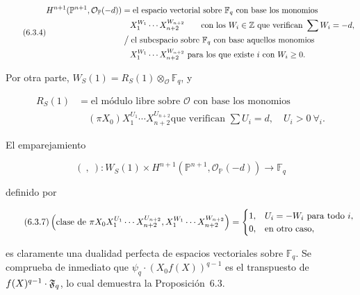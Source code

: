 {\footnotesize\begin{equation}\tag{6.3.4}
\begin{aligned}
H^{\sisi{i+1}{n+1}}(\mathbb P^{n+1},\mathcal O_{\mathbb P}(-d))
&=\text{el espacio vectorial sobre $\mathbb F_q$ con base los monomios}\\
&\quad X_1^{W_1}\cdots X_{n+2}^{W_{n+2}}
\qquad\text{con los }W_i\in\mathbb Z\text{ que verifican }\sum W_i=-d,\\
&\sisi{=}{\mathrel{\big/}}\text{el subespacio sobre $\mathbb F_q$ con base aquellos monomios}\\
&\quad X_1^{W_1}\cdots X_{n+2}^{W_{n+2}}
\text{ para los que existe }i\text{ con }W_i\geq0.
\end{aligned}
\end{equation}}

Por otra parte, $W_S(1)=R_S(1)\otimes_{\mathcal O}\mathbb F_q$, y

\begin{equation}\tag{6.3.5}
\begin{aligned}
R_S(1)
&=\text{el módulo libre sobre $\mathcal O$ con base los monomios}\\
&\quad
(\pi X_0)X_1^{U_1}\cdots X_{n+2}^{U_{n+2}}
\text{que verifican }
\sum U_i=d,\quad U_i>0\ \forall_i.
\end{aligned}
\end{equation}

El emparejamiento

\begin{equation}\tag{6.3.6}
(\ ,\ ):
W_S(1)\times
H^{n+1}(\mathbb P^{n+1},\mathcal O_{\mathbb P}(-d))
\longrightarrow\mathbb F_q
\end{equation}

definido por

{\small\begin{equation}\tag{6.3.7}
\left(
\text{clase de }\pi X_0X_1^{U_1}\cdots X_{n+2}^{U_{n+2}},
X_1^{W_1}\cdots X_{n+2}^{W_{n+2}}
\right)
=
\begin{cases}
1,&\sisi{U_1}{U_i}=-W_i\text{ para todo }i,\\
0,&\text{en otro caso},
\end{cases}
\end{equation}}

es claramente una dualidad perfecta de espacios vectoriales sobre
$\mathbb F_q$. Se comprueba de inmediato que
$\psi_q\cdot(X_0f(X))^{q-1}$ es el transpuesto de
$f(X)^{q-1}\cdot \sisi{f_q}{\mathfrak F_q}$, lo cual demuestra la Proposición~6.3.

